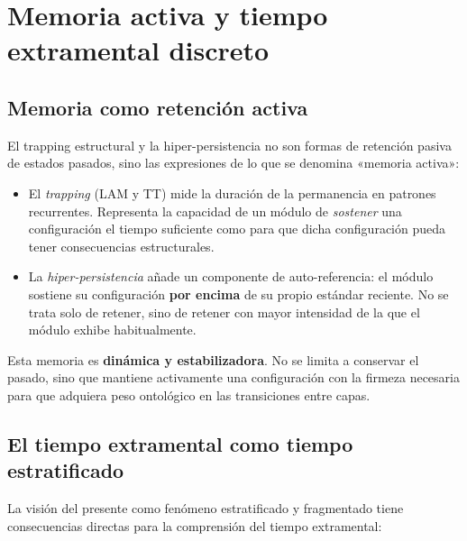 \section{Memoria activa y tiempo extramental discreto}

\subsection{Memoria como retención activa}

El trapping estructural y la hiper-persistencia no son formas de retención pasiva de estados pasados, sino las expresiones de lo que se denomina «memoria activa»:

\begin{itemize}
    \item El \textit{trapping} (LAM y TT) mide la duración de la permanencia en patrones recurrentes. Representa la capacidad de un módulo de \textit{sostener} una configuración el tiempo suficiente como para que dicha configuración pueda tener consecuencias estructurales.
    \item La \textit{hiper-persistencia} añade un componente de auto-referencia: el módulo sostiene su configuración \textbf{por encima} de su propio estándar reciente. No se trata solo de retener, sino de retener con mayor intensidad de la que el módulo exhibe habitualmente.
\end{itemize}

Esta memoria es \textbf{dinámica y estabilizadora}. No se limita a conservar el pasado, sino que mantiene activamente una configuración con la firmeza necesaria para que adquiera peso ontológico en las transiciones entre capas.

\subsection{El tiempo extramental como tiempo estratificado}

La visión del presente como fenómeno estratificado y fragmentado tiene consecuencias directas para la comprensión del tiempo extramental:

